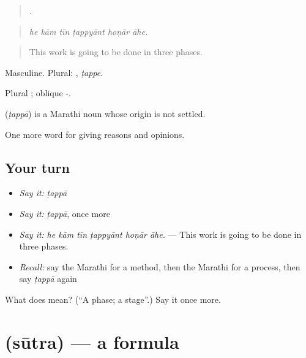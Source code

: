 \begin{quote}
     .
\end{quote}

\begin{quote}
\emph{he kām tīn ṭappyānt hoṇār āhe.}
\end{quote}

\begin{quote}
This work is going to be done in three phases.
\end{quote}

Masculine. Plural: , \emph{ṭappe}.

Plural ; oblique -.

\begin{cousinweb}
\textbf{} (\emph{ṭappā}) is a Marathi noun whose origin is not settled.
\end{cousinweb}

\begin{grammarlens}[title={What you've built}]
One more word for giving reasons and opinions.
\end{grammarlens}

\subsection*{Your turn}
\begin{itemize}
\raggedright
  \item \emph{Say it:} \emph{ṭappā}
  \item \emph{Say it:} \emph{ṭappā}, once more
  \item \emph{Say it:} \emph{he kām tīn ṭappyānt hoṇār āhe.} — This work is going to be done in three phases.
  \item \emph{Recall:} say the Marathi for a method, then the Marathi for a process, then say \emph{ṭappā} again
\end{itemize}

\begin{tcolorbox}[breakable,colback=teal!4,colframe=teal!35!black,title={Before you move on}]
What does  mean? (\textquotedblleft{}A phase; a stage\textquotedblright{}.) Say it once more.
\end{tcolorbox}
\section[\texorpdfstring{\mr{सूत्र} (sūtra)}{सूत्र (sūtra)}]{ (sūtra) — a formula}

